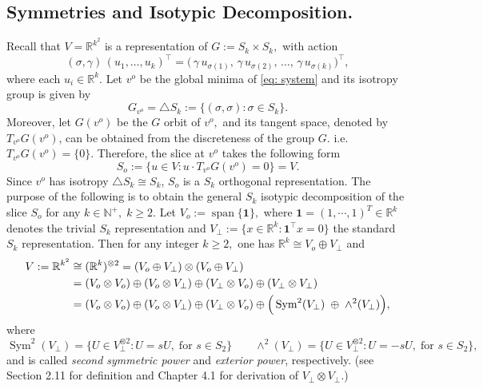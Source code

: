 \documentclass{amsart}%
\begin{document}
\subsection{Symmetries and Isotypic Decomposition.} \label{sec:2.2} 
Recall that \(V=\mathbb{R}^{k^2}\) is a representation of
$G:=S_k\times S_k,$
with action
\[
(\sigma,\gamma)\,(u_1,\dots,u_k)^\top
=\big(\,\gamma\,u_{\sigma(1)},\,\gamma\,u_{\sigma(2)},\,\dots,\,\gamma\,u_{\sigma(k)}\big)^\top,
\]
where each  \(u_i\in\mathbb{R}^k\).  
Let \(v^o\) be the global minima of \eqref{eq: system} and its isotropy group is  given by
\[
G_{v^o}=\triangle S_k:=\{(\sigma,\sigma): \sigma\in S_k\}.
\]
Moreover, let $G(v^o)$ be  the $G$ orbit of $v^o,$ and its tangent space, denoted by $T_{v^o}G(v^o)$, can be obtained from the discreteness of the group $G.$ i.e. $T_{v^o}G(v^o)=\{0\}.$ Therefore, the slice at $v^o$ takes the following form \[ S_o:=\{u\in V: u\cdot T_{v^o}G(v^o)=0\}=V. \] Since $v^o$ has isotropy $\triangle S_k\cong S_k$, $S_o$ is a $S_k$ orthogonal representation. The purpose of the following is to obtain the general $S_k$ isotypic decomposition of the slice $S_o$ for any $k\in \mathbb N^+,\; k\ge2$.\vskip0.3cm
Let \(V_o:=\operatorname{span}\{\mathbf 1\},\) where $\mathbf 1=(1,\cdots,1)^T\in \mathbb R^k$ denotes the trivial $S_k$ representation and \(V_\perp:=\{x\in\mathbb R^k:\mathbf 1^\top x=0\}\) the standard $S_k$ representation. Then for any integer $k\ge 2,$ one has
$\mathbb R^k\cong V_o\oplus V_{\perp}$ and 
\begin{align}\label{eq:V_dcom}
V:=\mathbb R^{k^2}&\cong({\mathbb R^k})^{\otimes 2}=(V_o\oplus V_{\perp})\otimes (V_o\oplus V_{\perp})\notag\\
&=(V_o\otimes V_o)\oplus (V_o\otimes V_{\perp})
\oplus (V_{\perp}\otimes V_o)\oplus (V_{\perp}\otimes V_{\perp})\notag\\
&=(V_o\otimes V_o)\oplus (V_o\otimes V_{\perp})
\oplus (V_{\perp}\otimes V_o)\oplus \Big(\operatorname{Sym}^2(V_{\perp}) \;\oplus\; \wedge^2(V_{\perp})\Big)\notag,
\end{align}
where 
\begin{equation}\label{eq:2}
\operatorname{Sym}^2(V_{\perp})=\{U\in V_{\perp}^{\otimes 2}:U=sU,\; \text{for } s\in S_2\} \qquad
  \wedge^2(V_{\perp})=\{U\in V_{\perp}^{\otimes 2}:U=-sU,\; \text{for } s\in S_2\},  
\end{equation}
and is called \textit{second symmetric power} and \textit{exterior power}, respectively. (see \cite{reprbook} Section 2.11 for definition and \cite{fulton2013representation} Chapter 4.1 for derivation of $V_{\perp}\otimes V_{\perp}$.) 
\end{document}
